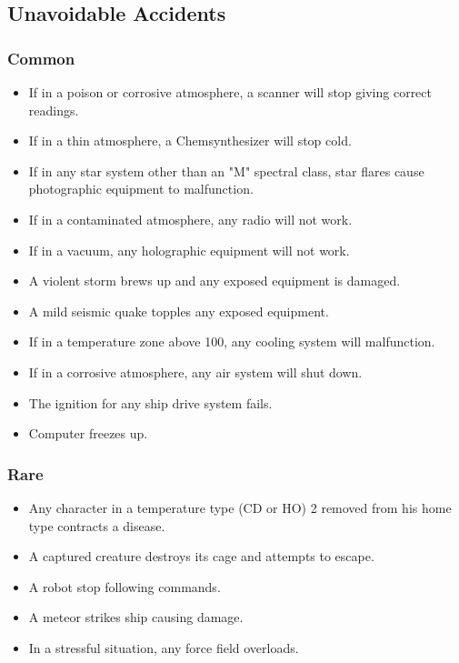 \subsection{Unavoidable Accidents}
\label{sec:unav-accid}


\subsubsection*{Common}
\label{sec:common}

\begin{itemize}
\item If in a poison or corrosive atmosphere, a scanner will stop
  giving correct readings.
\item If in a thin atmosphere, a Chemsynthesizer will stop cold.
\item If in any star system other than an "M" spectral class, star
  flares cause photographic equipment to malfunction.
\item If in a contaminated atmosphere, any radio will not work.
\item If in a vacuum, any holographic equipment will not work.
\item A violent storm brews up and any exposed equipment is damaged.
\item A mild seismic quake topples any exposed equipment.
\item If in a temperature zone above 100\textdegree, any cooling
  system will malfunction.
\item If in a corrosive atmosphere, any air system will shut down.
\item The ignition for any ship drive system fails.
\item Computer freezes up.
\end{itemize}

\subsubsection*{Rare}
\label{sec:rare}

\begin{itemize}
\item Any character in a temperature type (CD or HO) 2 removed from
  his home type contracts a disease.
\item A captured creature destroys its cage and attempts to escape.
\item A robot stop following commands.
\item A meteor strikes ship causing damage.
\item In a stressful situation, any force field overloads.
\end{itemize}

